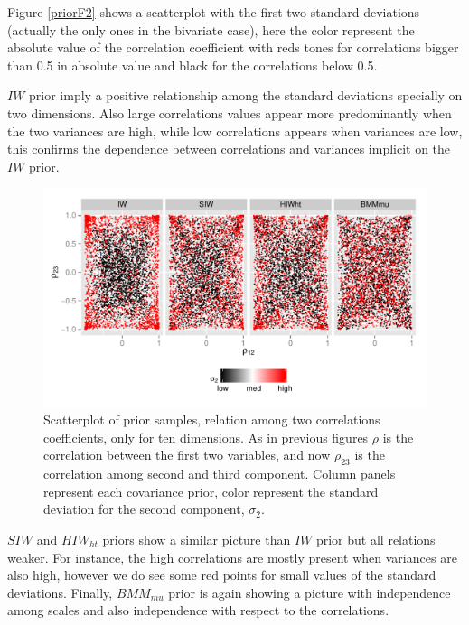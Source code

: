 \documentclass{article}
\begin{document}
Figure \ref{priorF2} shows a scatterplot with the first two standard deviations (actually the only ones in the bivariate case), here the color represent the absolute value of the correlation coefficient with reds tones for correlations bigger than 0.5 in absolute value and black for the correlations below 0.5. 

$IW$ prior imply a positive relationship among the standard deviations specially on two dimensions. Also large correlations values appear more predominantly when the two variances are high, while low correlations appears when variances are low, this confirms the dependence between correlations and variances implicit on the $IW$ prior. 

\begin{figure}[htbp]
\begin{center}
 \includegraphics[width=\textwidth ]{priorsroro} 
  \vspace{-.5in}
\caption{Scatterplot of prior samples, relation among two correlations coefficients, only for ten dimensions. As in previous figures $\rho$ is the correlation between the first two variables, and now $\rho_{23}$ is the correlation among second and third component. Column panels represent each covariance prior, color represent the standard deviation for the second component, $\sigma_2$. \label{roro}}
\end{center}
\end{figure}

$SIW$ and $HIW_{ht}$ priors show a similar picture than $IW$ prior but all relations weaker. For instance, the high correlations are mostly present when variances are also high, however we do see some red points for small values of the standard deviations. 
Finally,  $BMM_{mu}$ prior is again showing a picture with independence among scales and also independence with respect to the correlations. 
\end{document}
